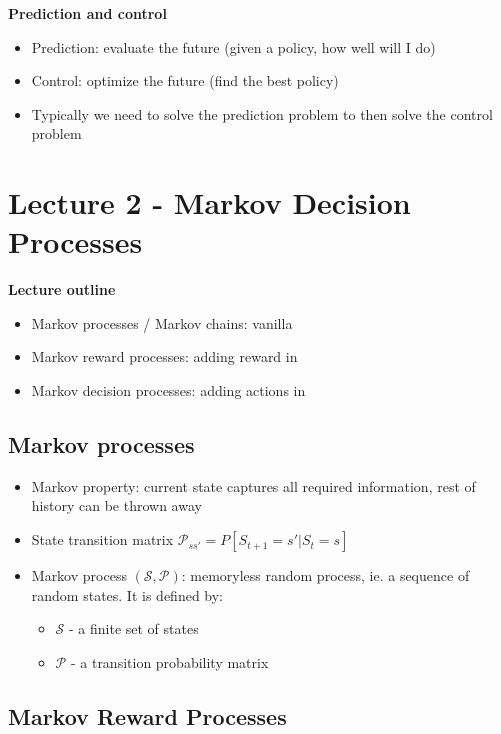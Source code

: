 \documentclass{article}
\begin{document}
\textbf{Prediction and control}
\begin{itemize}
    \item Prediction: evaluate the future (given a policy, how well will I do)
    \item Control: optimize the future (find the best policy)
    \item Typically we need to solve the prediction problem to then solve the control problem
\end{itemize}

\section{Lecture 2 - Markov Decision Processes}

\textbf{Lecture outline}
\begin{itemize}
    \item Markov processes / Markov chains: vanilla
    \item Markov reward processes: adding reward in
    \item Markov decision processes: adding actions in
\end{itemize}

\subsection{Markov processes}
\begin{itemize}
    \item Markov property: current state captures all required information, rest of history can be thrown away
    \item State transition matrix $\mathcal{P}_{ss'}=P[S_{t+1}=s'|S_t=s]$
    \item Markov process $(\mathcal{S}, \mathcal{P})$: memoryless random process, ie. a sequence of random states. It is defined by:
    \begin{itemize}
        \item $\mathcal{S}$ - a finite set of states
        \item $\mathcal{P}$ - a transition probability matrix
    \end{itemize}
\end{itemize}
    
\subsection{Markov Reward Processes}
\end{document}
